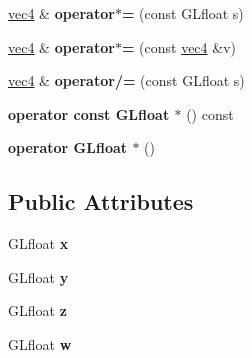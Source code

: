 \begin{DoxyCompactItemize}
\item 
\hypertarget{struct_angel_1_1vec4_aab6ea06360d12b1e2962d6c4ea4dc639}{\hyperlink{struct_angel_1_1vec4}{vec4} \& {\bfseries operator$\ast$=} (const \-G\-Lfloat s)}\label{struct_angel_1_1vec4_aab6ea06360d12b1e2962d6c4ea4dc639}

\item 
\hypertarget{struct_angel_1_1vec4_a2035c8e93278408c05404b713346d92d}{\hyperlink{struct_angel_1_1vec4}{vec4} \& {\bfseries operator$\ast$=} (const \hyperlink{struct_angel_1_1vec4}{vec4} \&v)}\label{struct_angel_1_1vec4_a2035c8e93278408c05404b713346d92d}

\item 
\hypertarget{struct_angel_1_1vec4_aacad340463007e48c1674689787e6b47}{\hyperlink{struct_angel_1_1vec4}{vec4} \& {\bfseries operator/=} (const \-G\-Lfloat s)}\label{struct_angel_1_1vec4_aacad340463007e48c1674689787e6b47}

\item 
\hypertarget{struct_angel_1_1vec4_a71c7509461ea7152c6785bfbc811ab64}{{\bfseries operator const G\-Lfloat $\ast$} () const }\label{struct_angel_1_1vec4_a71c7509461ea7152c6785bfbc811ab64}

\item 
\hypertarget{struct_angel_1_1vec4_abe6702f74ba431df65da55aa0df6de16}{{\bfseries operator G\-Lfloat $\ast$} ()}\label{struct_angel_1_1vec4_abe6702f74ba431df65da55aa0df6de16}

\end{DoxyCompactItemize}
\subsection*{\-Public \-Attributes}
\begin{DoxyCompactItemize}
\item 
\hypertarget{struct_angel_1_1vec4_aaf7881acf82e877f889905a1573d36ad}{\-G\-Lfloat {\bfseries x}}\label{struct_angel_1_1vec4_aaf7881acf82e877f889905a1573d36ad}

\item 
\hypertarget{struct_angel_1_1vec4_a2396916bf1051ee7d6c11e6f2a539308}{\-G\-Lfloat {\bfseries y}}\label{struct_angel_1_1vec4_a2396916bf1051ee7d6c11e6f2a539308}

\item 
\hypertarget{struct_angel_1_1vec4_ab62654db1d62f75cb4d1bec9e4543797}{\-G\-Lfloat {\bfseries z}}\label{struct_angel_1_1vec4_ab62654db1d62f75cb4d1bec9e4543797}

\item 
\hypertarget{struct_angel_1_1vec4_a27752dffc3cd1ac7aa2fc72d40a84a48}{\-G\-Lfloat {\bfseries w}}\label{struct_angel_1_1vec4_a27752dffc3cd1ac7aa2fc72d40a84a48}

\end{DoxyCompactItemize}
